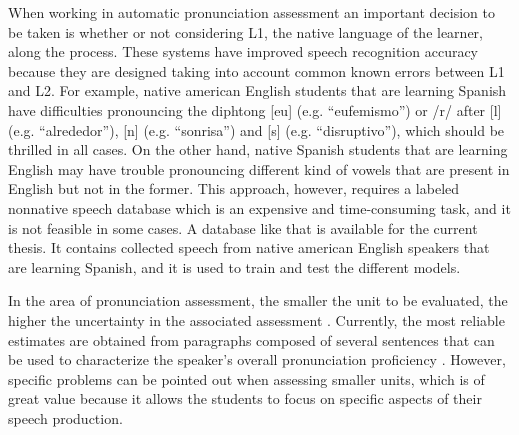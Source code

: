 When working in automatic pronunciation assessment an important decision to be taken is
whether or not considering L1, the native language of the learner, along the process. These
systems have improved speech recognition accuracy because they are designed
taking into account common known errors between L1 and L2. For example, native american English
students that are learning Spanish have difficulties pronouncing the diphtong [eu]
(e.g. ``eufemismo'') or
/r/ after [l] (e.g. ``alrededor''), [n] (e.g. ``sonrisa'') and [s] (e.g. ``disruptivo''),
which should be thrilled in all cases.
On the other hand, native Spanish students
that are learning English may have trouble pronouncing
different kind of vowels that are present in English
but not in the former. This approach, however, requires a labeled nonnative speech database
which is an expensive and time-consuming task, and
it is not feasible in some cases.
A database like that
is available
for the current thesis.
It contains collected
speech from native american English speakers that are learning
Spanish, and it is used to train and test the different models.




In the area of pronunciation assessment, the smaller the unit to be evaluated, the higher the
uncertainty in the associated assessment \cite{pronunciation_scoring_phone_segments_instruction}.
Currently, the most reliable estimates are obtained from paragraphs composed of several
sentences that can be used to characterize the speaker's overall pronunciation
proficiency \cite{main}. However, specific problems can be pointed out
when assessing smaller units, which is of great value because it allows the students to focus
on specific aspects of their speech production.

